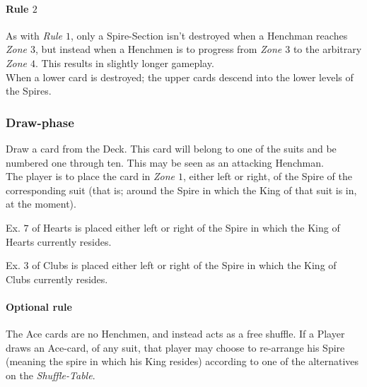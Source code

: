 \documentclass[11pt,twocolumn]{article}
\begin{document}
\paragraph{Rule $2$}
As with \textit{Rule $1$}, only a Spire-Section isn’t destroyed when a Henchman reaches \textit{Zone $3$}, but instead when a Henchmen is to progress from \textit{Zone $3$} to the arbitrary \textit{Zone $4$}.
This results in slightly longer gameplay.\\

\noindent
When a lower card is destroyed; the upper cards descend into the lower levels of the Spires.

\subsubsection{Draw-phase}
\label{sec:playingshufflespires_drawphase}
Draw a card from the Deck.
This card will belong to one of the suits and be numbered one through ten.
This may be seen as an attacking Henchman.\\

\noindent
The player is to place the card in \textit{Zone $1$}, either left or right, of the Spire of the corresponding suit (that is; around the Spire in which the King of that suit is in, at the moment).

Ex. $7$ of Hearts is placed either left or right of the Spire in which the King of Hearts currently resides.

Ex. $3$ of Clubs is placed either left or right of the Spire in which the King of Clubs currently resides.

\paragraph{Optional rule}
The Ace cards are no Henchmen, and instead acts as a free shuffle.
If a Player draws an Ace-card, of any suit, that player may choose to re-arrange his Spire (meaning the spire in which his King resides) according to one of the alternatives on the \textit{Shuffle-Table}.
\end{document}
